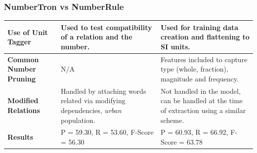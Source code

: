 \documentclass{beamer}
\begin{document}
\begin{frame}
\frametitle{NumberTron vs NumberRule}
\begin{tabularx}{\textwidth}{|b |b |b |}
\hline
\textbf{Use of Unit Tagger} & Used to test compatibility of a relation and the number.& Used for training data creation and flattening to SI units.\\ \hline
 \textbf{Common Number Pruning} & N/A & Features included to capture type (whole, fraction), magnitude and frequency. \\ \hline
 \textbf{Modified Relations} & Handled by attaching words related via modifying dependencies, \emph{urban} population.& Not handled in the model, can be handled at the time of extraction using a similar scheme. \\ \hline
  \textbf{Results} & P = 59.30, R = 53.60, F-Score = 56.30& P = 60.93, R = 66.92, F-Score = 63.78\\ \hline
\end{tabularx}
\end{frame}
\end{document}
